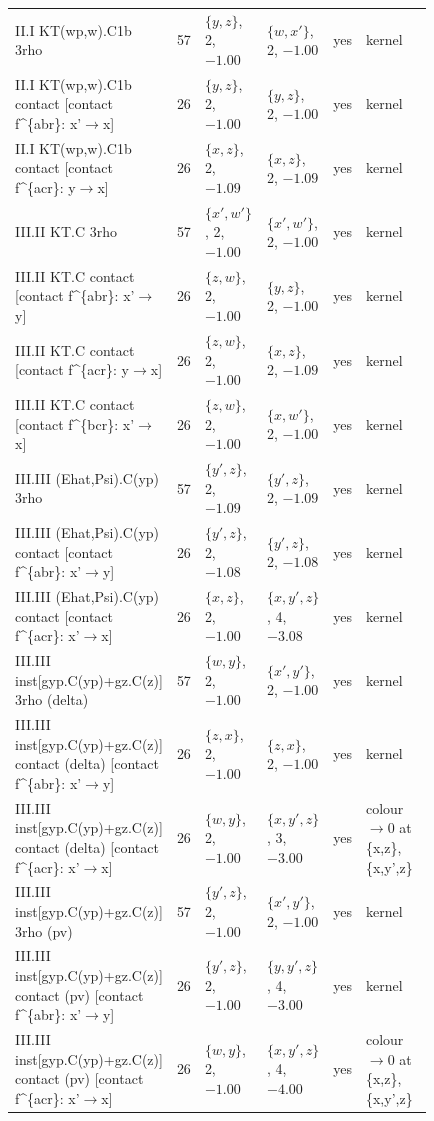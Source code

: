 \documentclass[9pt]{article}
\numberwithin{equation}{section}
\begin{document}
{\begin{center}
\begin{tabular}{|p{0.36\linewidth}|c|p{0.15\linewidth}|p{0.15\linewidth}|c|p{0.17\linewidth}|}
II.I KT(wp,w).C1b 3rho & 57 & $\{y,z\}$, 2, $-1.00$ & $\{w,x'\}$, 2, $-1.00$ & yes & kernel\\
II.I KT(wp,w).C1b contact [contact f\^{}\{abr\}: x'$\to$x] & 26 & $\{y,z\}$, 2, $-1.00$ & $\{y,z\}$, 2, $-1.00$ & yes & kernel\\
II.I KT(wp,w).C1b contact [contact f\^{}\{acr\}: y$\to$x] & 26 & $\{x,z\}$, 2, $-1.09$ & $\{x,z\}$, 2, $-1.09$ & yes & kernel\\
III.II KT.C 3rho & 57 & $\{x',w'\}$, 2, $-1.00$ & $\{x',w'\}$, 2, $-1.00$ & yes & kernel\\
III.II KT.C contact [contact f\^{}\{abr\}: x'$\to$y] & 26 & $\{z,w\}$, 2, $-1.00$ & $\{y,z\}$, 2, $-1.00$ & yes & kernel\\
III.II KT.C contact [contact f\^{}\{acr\}: y$\to$x] & 26 & $\{z,w\}$, 2, $-1.00$ & $\{x,z\}$, 2, $-1.09$ & yes & kernel\\
III.II KT.C contact [contact f\^{}\{bcr\}: x'$\to$x] & 26 & $\{z,w\}$, 2, $-1.00$ & $\{x,w'\}$, 2, $-1.00$ & yes & kernel\\
III.III (Ehat,Psi).C(yp) 3rho & 57 & $\{y',z\}$, 2, $-1.09$ & $\{y',z\}$, 2, $-1.09$ & yes & kernel\\
III.III (Ehat,Psi).C(yp) contact [contact f\^{}\{abr\}: x'$\to$y] & 26 & $\{y',z\}$, 2, $-1.08$ & $\{y',z\}$, 2, $-1.08$ & yes & kernel\\
III.III (Ehat,Psi).C(yp) contact [contact f\^{}\{acr\}: x'$\to$x] & 26 & $\{x,z\}$, 2, $-1.00$ & $\{x,y',z\}$, 4, $-3.08$ & yes & kernel\\
III.III inst[gyp.C(yp)+gz.C(z)] 3rho (delta) & 57 & $\{w,y\}$, 2, $-1.00$ & $\{x',y'\}$, 2, $-1.00$ & yes & kernel\\
III.III inst[gyp.C(yp)+gz.C(z)] contact (delta) [contact f\^{}\{abr\}: x'$\to$y] & 26 & $\{z,x\}$, 2, $-1.00$ & $\{z,x\}$, 2, $-1.00$ & yes & kernel\\
III.III inst[gyp.C(yp)+gz.C(z)] contact (delta) [contact f\^{}\{acr\}: x'$\to$x] & 26 & $\{w,y\}$, 2, $-1.00$ & $\{x,y',z\}$, 3, $-3.00$ & yes & colour $\to0$ at \{x,z\}, \{x,y',z\}\\
III.III inst[gyp.C(yp)+gz.C(z)] 3rho (pv) & 57 & $\{y',z\}$, 2, $-1.00$ & $\{x',y'\}$, 2, $-1.00$ & yes & kernel\\
III.III inst[gyp.C(yp)+gz.C(z)] contact (pv) [contact f\^{}\{abr\}: x'$\to$y] & 26 & $\{y',z\}$, 2, $-1.00$ & $\{y,y',z\}$, 4, $-3.00$ & yes & kernel\\
III.III inst[gyp.C(yp)+gz.C(z)] contact (pv) [contact f\^{}\{acr\}: x'$\to$x] & 26 & $\{w,y\}$, 2, $-1.00$ & $\{x,y',z\}$, 4, $-4.00$ & yes & colour $\to0$ at \{x,z\}, \{x,y',z\}\\

\end{tabular}
\end{center}}
\end{document}

